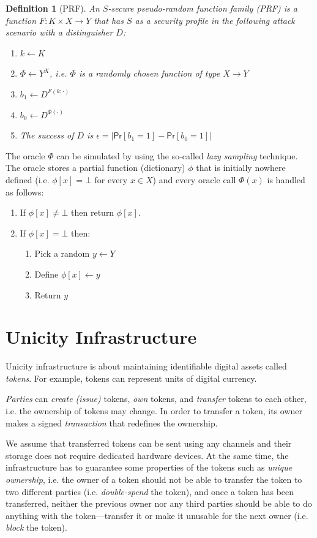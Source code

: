 \documentclass{article}
\newtheorem{definition}{Definition}[section]
\begin{document}
\begin{definition}[PRF] An $S$-secure \emph{pseudo-random function family (PRF)} is a function $F\colon K\times X \rightarrow Y$ that has $S$ as a security profile in the following attack scenario with a distinguisher $D$:
\begin{enumerate}
\item $k\gets K$
\item $\Phi\gets Y^X$, i.e. $\Phi$ is a randomly chosen function of type $X\rightarrow Y$
\item $b_1\gets D^{F(k;\cdot)}$
\item $b_0\gets D^{\Phi(\cdot)}$
\item The success of $D$ is
$\epsilon=|\mathsf{Pr}[b_1=1]-\mathsf{Pr}[b_0=1]|$
\end{enumerate}
\end{definition}
The oracle $\Phi$ can be simulated by using the so-called \emph{lazy sampling} technique. The oracle stores a partial function (dictionary) $\phi$
that is initially nowhere defined (i.e. $\phi[x]=\bot$ for every $x\in X$) and every oracle call $\Phi(x)$ is handled as follows:
\begin{enumerate}
\item If $\phi[x]\neq \bot$ then return $\phi[x]$.
\item If $\phi[x]=\bot$ then:
\begin{enumerate}
\item Pick a random $y\gets Y$
\item Define $\phi[x]\gets y$
\item Return $y$
\end{enumerate}
\end{enumerate}



\section{Unicity Infrastructure}

Unicity infrastructure is about maintaining identifiable digital assets called \emph{tokens}. For example, tokens can represent units of digital currency.

\emph{Parties} can \emph{create (issue)} tokens, \emph{own} tokens, and \emph{transfer} tokens to each other, i.e. the ownership of tokens may change. In order to transfer a token, its owner makes a signed \emph{transaction} that redefines the ownership.

We assume that transferred tokens can be sent using any channels and their storage does not require dedicated hardware devices. At the same time, the infrastructure has to guarantee some properties of the tokens such as \emph{unique ownership}, i.e. the owner of a token should not be able to transfer the token to two different parties (i.e. \emph{double-spend} the token), and once a token has been transferred, neither the previous owner nor any third parties should be able to do anything with the token---transfer it or make it unusable for the next owner (i.e. \emph{block} the token).
\end{document}
